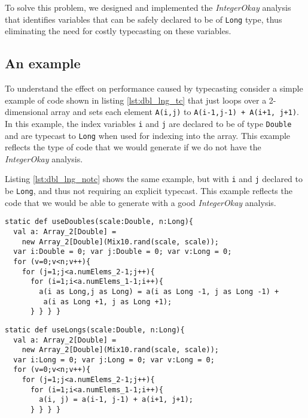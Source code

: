 To solve this problem, we designed and implemented the
\emph{IntegerOkay} analysis that identifies variables that can be
safely declared to be of \texttt{Long} type, thus eliminating the need
for costly typecasting on these variables.

\subsection{An example}

To understand the effect on performance caused by typecasting consider a
simple example of \xten code shown in listing \ref{lst:dbl_lng_tc} that just loops
over a 2-dimensional array and sets each element \texttt{A(i,j)} to
\texttt{A(i-1,j-1) + A(i+1, j+1)}.
In this example, the
index variables \texttt{i} and \texttt{j} are declared to be of type
\texttt{Double} and are typecast to \texttt{Long} when used for indexing
into the array.   This example reflects the type of \xten code that we
would generate if we do not have the \emph{IntegerOkay} analysis.

Listing \ref{lst:dbl_lng_notc} shows the same example,
but with \texttt{i} and \texttt{j} declared to be \texttt{Long}, and
thus not requiring an explicit typecast. This example reflects the code
that we would be able to generate with a good \emph{IntegerOkay} analysis.

\begin{lstlisting}[caption={Example for using \texttt{Double} variables for
array indexing},label={lst:dbl_lng_tc},language=x10,numbers=none]
static def useDoubles(scale:Double, n:Long){
  val a: Array_2[Double] = 
    new Array_2[Double](Mix10.rand(scale, scale));
  var i:Double = 0; var j:Double = 0; var v:Long = 0;
  for (v=0;v<n;v++){
    for (j=1;j<a.numElems_2-1;j++){
      for (i=1;i<a.numElems_1-1;i++){
        a(i as Long,j as Long) = a(i as Long -1, j as Long -1) + 
         a(i as Long +1, j as Long +1);
      } } } } 
\end{lstlisting}

\begin{lstlisting}[caption={Example for using \texttt{Long} variables for
indexing},label={lst:dbl_lng_notc},language=x10,numbers=none]
static def useLongs(scale:Double, n:Long){
  val a: Array_2[Double] = 
    new Array_2[Double](Mix10.rand(scale, scale));
  var i:Long = 0; var j:Long = 0; var v:Long = 0;
  for (v=0;v<n;v++){
    for (j=1;j<a.numElems_2-1;j++){
      for (i=1;i<a.numElems_1-1;i++){
        a(i, j) = a(i-1, j-1) + a(i+1, j+1);
      } } } }
\end{lstlisting}

